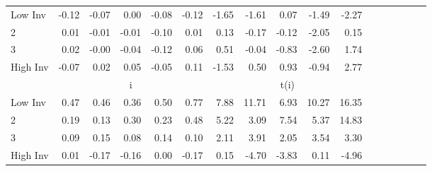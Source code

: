 \begin{table}[!ht]
\begin{tabular}{lrrrrrrrrrrrrrrrr}
    \\
      \cmidrule(r){2-5} \cmidrule(r){6-9} \cmidrule(r){10-13} \cmidrule(r){14-17}

    Low Inv   & -0.12  & -0.07  & 0.00  & -0.08  & -0.12  & -1.65  & -1.61  & 0.07  & -1.49  & -2.27  \\
           2  & 0.01  & -0.01  & -0.01  & -0.10  & 0.01  & 0.13  & -0.17  & -0.12  & -2.05  & 0.15  \\
           3  & 0.02  & -0.00  & -0.04  & -0.12  & 0.06  & 0.51  & -0.04  & -0.83  & -2.60  & 1.74  \\
    High Inv  & -0.07  & 0.02  & 0.05  & -0.05  & 0.11  & -1.53  & 0.50  & 0.93  & -0.94  & 2.77  \\

  
    
      & \multicolumn{5}{c}{i} & \multicolumn{5}{c}{t(i)}
    
    \\
      \cmidrule(r){2-5} \cmidrule(r){6-9} \cmidrule(r){10-13} \cmidrule(r){14-17}

    Low Inv   & 0.47  & 0.46  & 0.36  & 0.50  & 0.77  & 7.88  & 11.71  & 6.93  & 10.27  & 16.35  \\
           2  & 0.19  & 0.13  & 0.30  & 0.23  & 0.48  & 5.22  & 3.09  & 7.54  & 5.37  & 14.83  \\
           3  & 0.09  & 0.15  & 0.08  & 0.14  & 0.10  & 2.11  & 3.91  & 2.05  & 3.54  & 3.30  \\
    High Inv  & 0.01  & -0.17  & -0.16  & 0.00  & -0.17  & 0.15  & -4.70  & -3.83  & 0.11  & -4.96  \\

  

  \bottomrule
\end{tabular}
\label{tbl:25_Size_BM_Inv_FF2016}
\end{table}